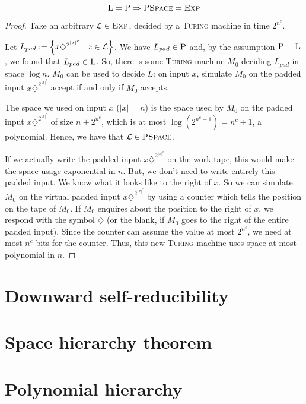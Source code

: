 \begin{thm}
    $$\LogSpace=\P \Rightarrow \pSpace = \Exp$$
\end{thm}
\begin{proof}
Take an arbitrary $\L \in \Exp$, decided by a \textsc{Turing} machine in time $2^{n^c}$.

Let $L_{pad}:=\set{x\diamondsuit^{2^{\lvert x \rvert^c}} \mid x \in \L}$. We have $L_{pad} \in \P$ and, by the assumption $\P=\LogSpace$, we found that $L_{pad} \in \LogSpace$. So, there is some \textsc{Turing} machine $M_0$ deciding $L_{pad}$ in space $\log n$. $M_0$ can be used to decide $L$: on input $x$, simulate $M_0$ on the padded input $x\diamondsuit^{2^{\lvert x \rvert^c}}$ accept if and only if $M_0$ accepts.

The space we used on input $x$ ($\vert x\vert=n$) is the space used by $M_0$ on the padded input $x\diamondsuit^{2^{\lvert x \rvert^c}}$ of size $n + 2^{n^c}$, which is at most $\log\left(2^{n^c+1}\right) = n^c + 1$, a polynomial. Hence, we have that $\L \in \pSpace$. 

If we actually write the padded input $x\diamondsuit^{2^{\lvert x \rvert^c}}$ on the work tape, this would make the space usage exponential in $n$. But, we don't need to write entirely this padded input. We know what it looks like to the right of $x$. So we can simulate $M_0$ on the virtual padded input $x\diamondsuit^{2^{\lvert x \rvert^c}}$ by using a counter which tells the position on the tape of $M_0$. If $M_0$ enquires about the position to the right of $x$, we respond with the symbol $\diamondsuit$ (or the blank, if $M_0$ goes to the right of the entire padded input). Since the counter can assume the value at most $2^{n^c}$, we need at most $n^c$ bits for the counter. Thus, this new \textsc{Turing} machine uses space at most polynomial in $n$.
\end{proof}

\section{Downward self-reducibility}

\section{Space hierarchy theorem}

\section{Polynomial hierarchy}



